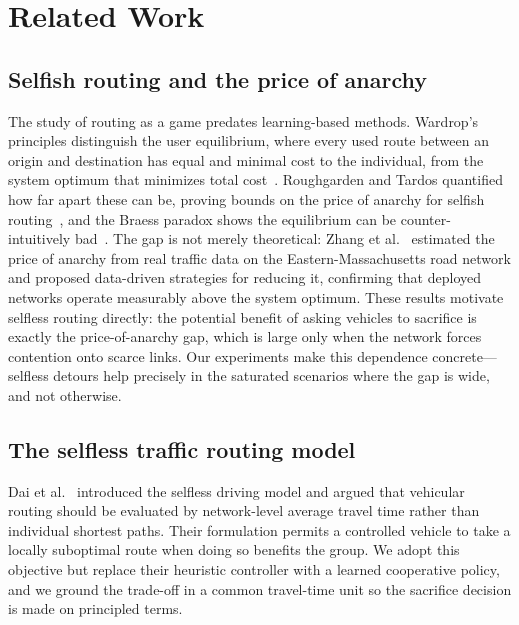 \section{Related Work}

\subsection{Selfish routing and the price of anarchy}
The study of routing as a game predates learning-based methods. Wardrop's principles
distinguish the user equilibrium, where every used route between an origin and
destination has equal and minimal cost to the individual, from the system optimum that
minimizes total cost~\cite{wardrop1952}. Roughgarden and Tardos quantified how far apart
these can be, proving bounds on the price of anarchy for selfish
routing~\cite{roughgarden2002selfish}, and the Braess paradox shows the equilibrium can
be counter-intuitively bad~\cite{braess2005paradox}. The gap is not merely theoretical:
Zhang et al.~\cite{zhang2018poa} estimated the price of anarchy from real traffic data on
the Eastern-Massachusetts road network and proposed data-driven strategies for reducing
it, confirming that deployed networks operate measurably above the system optimum. These
results motivate selfless routing directly: the potential benefit of asking vehicles to sacrifice is exactly the
price-of-anarchy gap, which is large only when the network forces contention onto scarce
links. Our experiments make this dependence concrete---selfless detours help precisely
in the saturated scenarios where the gap is wide, and not otherwise.

\subsection{The selfless traffic routing model}
Dai et al.~\cite{dai2019str} introduced the selfless driving model and argued that
vehicular routing should be evaluated by network-level average travel time rather than
individual shortest paths. Their formulation permits a controlled vehicle to take a locally
suboptimal route when doing so benefits the group. We adopt this objective but replace
their heuristic controller with a learned cooperative policy, and we ground the trade-off
in a common travel-time unit so the sacrifice decision is made on principled terms.

